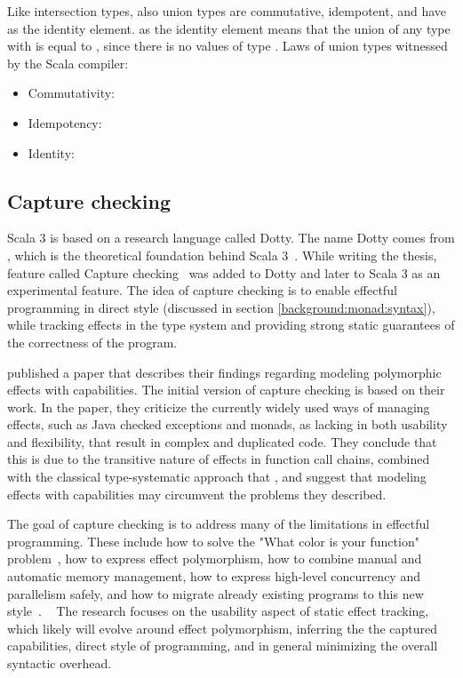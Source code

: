 Like intersection types, also union types are commutative, idempotent, and have  as the identity element.  as the identity element means that the union of any type  with  is equal to , since there is no values of type . Laws of union types witnessed by the Scala compiler:
\begin{itemize}
    \item Commutativity: 
    \item Idempotency: 
    \item Identity: 
\end{itemize}


\subsection{Capture checking}
Scala 3 is based on a research language called Dotty. The name Dotty comes from , which is the theoretical foundation behind Scala 3~\cite{essence-of-dot}. While writing the thesis, feature called Capture checking~\cite{capture-checking} was added to Dotty and later to Scala 3 as an experimental feature. The idea of capture checking is to enable effectful programming in direct style (discussed in section \ref{background:monad:syntax}), while tracking effects in the type system and providing strong static guarantees of the correctness of the program.

\textcite{scoped-capabilities} published a paper that describes their findings regarding modeling polymorphic effects with capabilities. The initial version of capture checking is based on their work.  In the paper, they criticize the currently widely used ways of managing effects, such as Java checked exceptions and monads, as lacking in both usability and flexibility, that result in complex and duplicated code. They conclude that this is due to the transitive nature of effects in function call chains, combined with the classical type-systematic approach that , and suggest that modeling effects with capabilities may circumvent the problems they described.

The goal of capture checking is to address many of the limitations in effectful programming. These include how to solve the "What color is your function" problem~\cite{what-color-is-your-function}, how to express effect polymorphism, how to combine manual and automatic memory management, how to express high-level concurrency and parallelism safely, and how to migrate already existing programs to this new style~\cite{odersky-twitter-caprese}. ~ The research focuses on the usability aspect of static effect tracking, which likely will evolve around effect polymorphism, inferring the the captured capabilities, direct style of programming, and in general minimizing the overall syntactic overhead.

